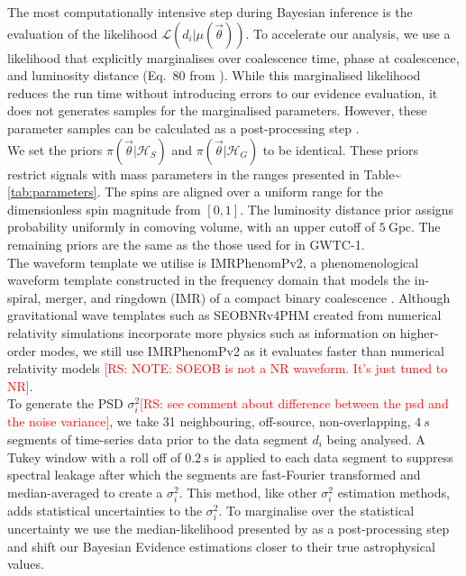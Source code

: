 \documentclass[%
preprint,
 amsmath,amssymb,
 aps,
]{revtex4}
\newcommand{\imrphenomp}{{\sc IMRPhenomPv2}\xspace}
\newcommand{\seob}{{\sc SEOBNRv4PHM}\xspace}
\newcommand{\psd}{{\sc $\sigma^2_i$}\xspace}
\newcommand{\rs}[1]{\textcolor{red}{[RS: #1]}}
\begin{document}
The most computationally intensive step during Bayesian inference is the evaluation of the likelihood $\mathcal{L}(d_i|\mu(\vec{\theta}))$. To accelerate our analysis, we use a likelihood that explicitly marginalises over coalescence time, phase at coalescence, and luminosity distance (Eq.~80 from \citet{intro_to_gw_bayes}). While this marginalised likelihood reduces the run time without introducing errors to our evidence evaluation, it does not generates samples for the marginalised parameters. However, these parameter samples can be calculated as a post-processing step \cite{intro_to_gw_bayes}.\\

We set the priors $\pi(\vec{\theta}|\mathcal{H}_S)$ and $\pi(\vec{\theta}|\mathcal{H}_G)$ to be identical. These priors restrict signals with mass parameters in the ranges presented in Table\textasciitilde\ref{tab:parameters}. The spins are aligned over a uniform range for the dimensionless spin magnitude from $\left[0,1\right]$. The luminosity distance prior assigns probability uniformly in comoving volume, with an upper cutoff of $5\ \text{Gpc}$. The remaining priors are the same as the those used for in GWTC-1. \\

The waveform template we utilise is \imrphenomp, a phenomenological waveform template constructed in the frequency domain that models the in-spiral, merger, and ringdown (IMR) of a compact binary coalescence \citep{khan2016frequency}. Although gravitational wave templates such as \seob \cite{seob} created from numerical relativity simulations incorporate more physics such as information on higher-order modes, we still use \imrphenomp as it evaluates faster than numerical relativity models \rs{NOTE: SOEOB is not a NR waveform. It's just tuned to NR}. \\

To generate the PSD \psd \rs{see comment about difference between the psd and the noise variance}, we take 31 neighbouring, off-source, non-overlapping,  $4\ s$  segments of time-series data prior to the data segment $d_i$ being analysed. A Tukey window with a roll off of $0.2\ \text{s}$ is applied to each data segment to suppress spectral leakage after which the segments are fast-Fourier transformed and median-averaged to create a \psd \cite{ligo_psd}. This method, like other \psd estimation methods, adds statistical uncertainties to the \psd \cite{psd_student_t}. To marginalise over the statistical uncertainty we use the median-likelihood presented by \citet{psd_student_t} as a post-processing step and shift our Bayesian Evidence estimations closer to their true astrophysical values. \\ 
\end{document}
